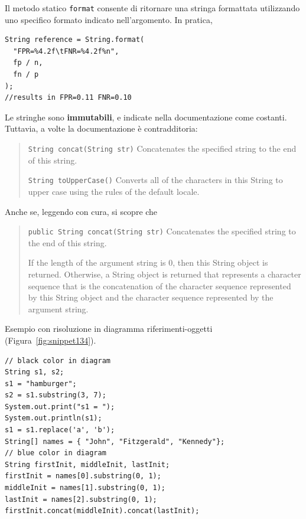 \documentclass[\fontsizeclass,twocolumn]{\classname}
\theoremstyle{definition}
\theoremstyle{definition}
\begin{document}
Il metodo statico \texttt{format} consente di ritornare una stringa formattata
utilizzando uno specifico formato indicato nell'argomento. In pratica,
\begin{lstlisting}
String reference = String.format(
  "FPR=%4.2f\tFNR=%4.2f%n",
  fp / n,
  fn / p
);
//results in FPR=0.11 FNR=0.10
\end{lstlisting}

Le stringhe sono \textbf{immutabili}, e indicate nella documentazione come
costanti. Tuttavia, a volte la documentazione è contradditoria:
\begin{quote}
\footnotesize{\texttt{String 	concat(String str)} 	Concatenates the specified string to the end of
this string.

\texttt{String 	toUpperCase()} 	Converts all of the characters in this String to upper
case using the rules of the default locale.}
\end{quote}

Anche se, leggendo con cura, si scopre che
\begin{quote}
    \footnotesize{\texttt{public String concat(String str)}
Concatenates the specified string to the end of this string.

If the length of the argument string is 0, then this String object is returned.
Otherwise, a String object is returned that represents a character sequence
that is the concatenation of the character sequence represented by this String
object and the character sequence represented by the argument string.}
\end{quote}

Esempio con risoluzione in diagramma riferimenti-oggetti
(Figura~\ref{fig:snippet134}).

\begin{lstlisting}
// black color in diagram
String s1, s2;
s1 = "hamburger";
s2 = s1.substring(3, 7);
System.out.print("s1 = ");
System.out.println(s1);
s1 = s1.replace('a', 'b');
String[] names = { "John", "Fitzgerald", "Kennedy"};
// blue color in diagram
String firstInit, middleInit, lastInit;
firstInit = names[0].substring(0, 1);
middleInit = names[1].substring(0, 1);
lastInit = names[2].substring(0, 1);
firstInit.concat(middleInit).concat(lastInit);
\end{lstlisting}
\end{document}
